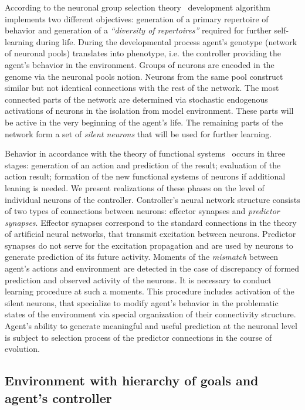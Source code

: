\documentclass[letterpaper]{article}
\begin{document}
According to the neuronal group selection theory~\citep{Edelman1993} development algorithm implements two different objectives: generation of a primary repertoire of behavior and generation of a {\em ``diversity of repertoires''} required for further self-learning during life. During the developmental process agent's genotype (network of neuronal pools) translates into phenotype, i.e. the controller providing the agent's behavior in the environment. Groups of neurons are encoded in the genome via the neuronal pools notion. Neurons from the same pool construct similar but not identical connections with the rest of the network. The most connected parts of the network are determined via stochastic endogenous activations of neurons in the isolation from model environment. These parts will be active in the very beginning of the agent's life. The remaining parts of the network form a set of {\em silent neurons} that will be used for further learning.     

Behavior in accordance with the theory of functional systems~\citep{Anokhin1974} occurs in three stages: generation of an action and prediction of the result; evaluation of the action result; formation of the new functional systems of neurons if additional leaning is needed. We present realizations of these phases on the level of individual neurons of the controller. Controller's neural network structure consists of two types of connections between neurons: effector synapses and {\em predictor synapses}. Effector synapses correspond to the standard connections in the theory of artificial neural networks, that transmit excitation between neurons. Predictor synapses do not serve for the excitation propagation and are used by neurons to generate prediction of its future activity. Moments of the {\em mismatch} between agent's actions and environment are detected in the case of discrepancy of formed prediction and observed activity of the neurons. It is necessary to conduct learning procedure at such a moments. This procedure includes activation of the silent neurons, that specialize to modify agent's behavior in the problematic states of the environment via special organization of their connectivity structure. Agent's ability to generate meaningful and useful prediction at the neuronal level is subject to selection process of the predictor connections in the course of evolution.

\subsection{Environment with hierarchy of goals and agent's controller}
\end{document}
